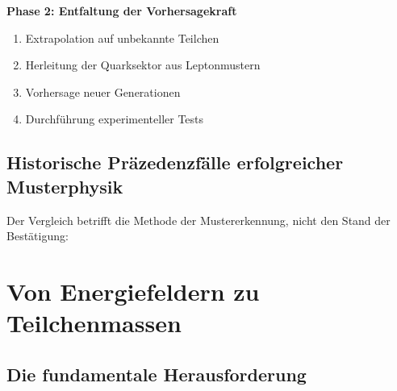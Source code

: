 \textbf{Phase 2: Entfaltung der Vorhersagekraft}
\begin{enumerate}
	\item Extrapolation auf unbekannte Teilchen
	\item Herleitung der Quarksektor aus Leptonmustern
	\item Vorhersage neuer Generationen
	\item Durchführung experimenteller Tests
\end{enumerate}

\subsection{Historische Präzedenzfälle erfolgreicher Musterphysik}
\label{subsec:historical_precedence}

Der Vergleich betrifft die Methode der Mustererkennung, nicht den Stand der Bestätigung:

\begin{table}[H]
	\centering
	\caption{Historische Präzedenzfälle der Musterphysik}
	\label{tab:historical_precedence}
\end{table}

\section{Von Energiefeldern zu Teilchenmassen}
\label{sec:energy_fields_to_masses}

\subsection{Die fundamentale Herausforderung}
\label{subsec:fundamental_challenge}

